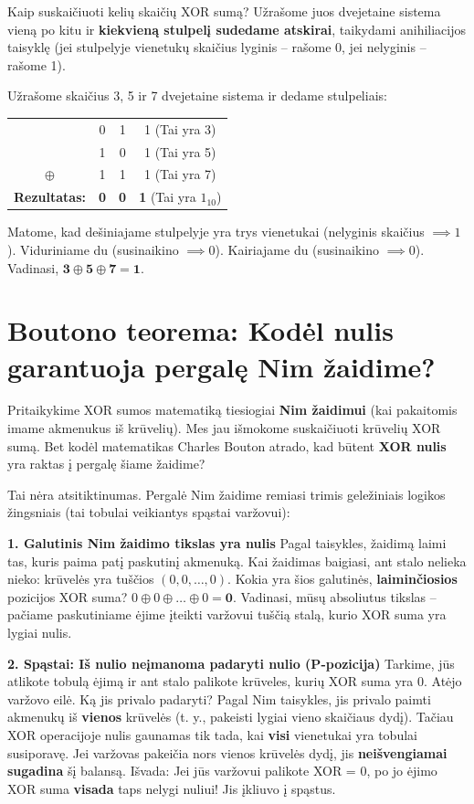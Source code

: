 \documentclass[11pt,a4paper]{scrartcl}
\begin{document}
Kaip suskaičiuoti kelių skaičių XOR sumą? Užrašome juos dvejetaine sistema vieną po kitu ir \textbf{kiekvieną stulpelį sudedame atskirai}, taikydami anihiliacijos taisyklę (jei stulpelyje vienetukų skaičius lyginis – rašome 0, jei nelyginis – rašome 1).

\begin{example}
Užrašome skaičius 3, 5 ir 7 dvejetaine sistema ir dedame stulpeliais:
\begin{center}
\begin{tabular}{c c c c}
  & 0 & 1 & 1 \quad (Tai yra 3)\\
  & 1 & 0 & 1 \quad (Tai yra 5)\\
  $\oplus$ & 1 & 1 & 1 \quad (Tai yra 7)\\
\hline
\textbf{Rezultatas:} & \textbf{0} & \textbf{0} & \textbf{1} \quad (Tai yra $1_{10}$)
\end{tabular}
\end{center}
Matome, kad dešiniajame stulpelyje yra trys vienetukai (nelyginis skaičius $\implies 1$). Viduriniame du (susinaikino $\implies 0$). Kairiajame du (susinaikino $\implies 0$). Vadinasi, $\mathbf{3 \oplus 5 \oplus 7 = 1}$.
\end{example}

\section{Boutono teorema: Kodėl nulis garantuoja pergalę Nim žaidime?}

Pritaikykime XOR sumos matematiką tiesiogiai \textbf{Nim žaidimui} (kai pakaitomis imame akmenukus iš krūvelių). Mes jau išmokome suskaičiuoti krūvelių XOR sumą. Bet kodėl matematikas Charles Bouton atrado, kad būtent \textbf{XOR nulis} yra raktas į pergalę šiame žaidime? 

Tai nėra atsitiktinumas. Pergalė Nim žaidime remiasi trimis geležiniais logikos žingsniais (tai tobulai veikiantys spąstai varžovui):

\textbf{1. Galutinis Nim žaidimo tikslas yra nulis}
Pagal taisykles, žaidimą laimi tas, kuris paima patį paskutinį akmenuką. Kai žaidimas baigiasi, ant stalo nelieka nieko: krūvelės yra tuščios $(0, 0, \dots, 0)$. 
Kokia yra šios galutinės, \textbf{laiminčiosios} pozicijos XOR suma? $0 \oplus 0 \oplus \dots \oplus 0 = \mathbf{0}$.
Vadinasi, mūsų absoliutus tikslas – pačiame paskutiniame ėjime įteikti varžovui tuščią stalą, kurio XOR suma yra lygiai nulis.

\textbf{2. Spąstai: Iš nulio neįmanoma padaryti nulio (P-pozicija)}
Tarkime, jūs atlikote tobulą ėjimą ir ant stalo palikote krūveles, kurių XOR suma yra $0$. Atėjo varžovo eilė. 
Ką jis privalo padaryti? Pagal Nim taisykles, jis privalo paimti akmenukų iš \textbf{vienos} krūvelės (t. y., pakeisti lygiai vieno skaičiaus dydį).
Tačiau XOR operacijoje nulis gaunamas tik tada, kai \textbf{visi} vienetukai yra tobulai susiporavę. Jei varžovas pakeičia nors vienos krūvelės dydį, jis \textbf{neišvengiamai sugadina} šį balansą. 
Išvada: Jei jūs varžovui palikote XOR = 0, po jo ėjimo XOR suma \textbf{visada} taps nelygi nuliui! Jis įkliuvo į spąstus.
\end{document}

